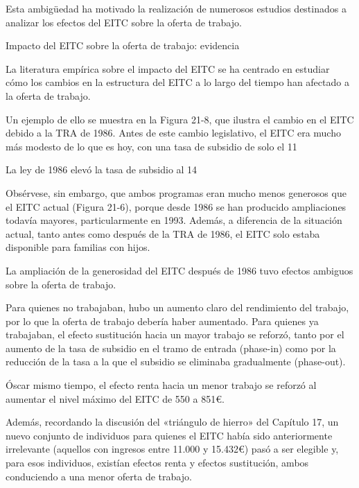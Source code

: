 \documentclass[10pt,a4paper]{article}
\begin{document}
Esta ambigüedad ha motivado la realización de numerosos estudios destinados a analizar los efectos del EITC sobre la oferta de trabajo.


Impacto del EITC sobre la oferta de trabajo: evidencia

La literatura empírica sobre el impacto del EITC se ha centrado en estudiar cómo los cambios en la estructura del EITC a lo largo del tiempo han afectado a la oferta de trabajo.

Un ejemplo de ello se muestra en la Figura 21-8, que ilustra el cambio en el EITC debido a la TRA de 1986. Antes de este cambio legislativo, el EITC era mucho más modesto de lo que es hoy, con una tasa de subsidio de solo el 11 %

La ley de 1986 elevó la tasa de subsidio al 14 %

Obsérvese, sin embargo, que ambos programas eran mucho menos generosos que el EITC actual (Figura 21-6), porque desde 1986 se han producido ampliaciones todavía mayores, particularmente en 1993. Además, a diferencia de la situación actual, tanto antes como después de la TRA de 1986, el EITC solo estaba disponible para familias con hijos.

La ampliación de la generosidad del EITC después de 1986 tuvo efectos ambiguos sobre la oferta de trabajo.

Para quienes no trabajaban, hubo un aumento claro del rendimiento del trabajo, por lo que la oferta de trabajo debería haber aumentado. Para quienes ya trabajaban, el efecto sustitución hacia un mayor trabajo se reforzó, tanto por el aumento de la tasa de subsidio en el tramo de entrada (phase-in) como por la reducción de la tasa a la que el subsidio se eliminaba gradualmente (phase-out).

Óscar mismo tiempo, el efecto renta hacia un menor trabajo se reforzó al aumentar el nivel máximo del EITC de 550 a 851€.

Además, recordando la discusión del «triángulo de hierro» del Capítulo 17, un nuevo conjunto de individuos para quienes el EITC había sido anteriormente irrelevante (aquellos con ingresos entre 11.000 y 15.432€) pasó a ser elegible y, para esos individuos, existían efectos renta y efectos sustitución, ambos conduciendo a una menor oferta de trabajo.
\end{document}
